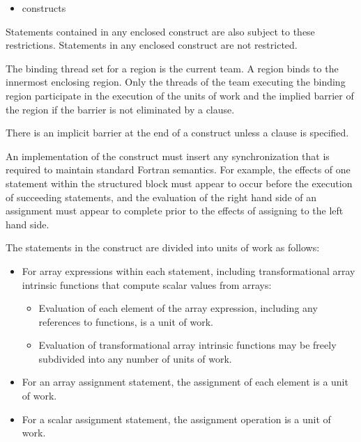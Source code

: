 \begin{fortranspecific}
\begin{itemize}
\item {} constructs
\end{itemize}

Statements contained in any enclosed  construct are also subject to these
restrictions. Statements in any enclosed  construct are not restricted.

\binding
The binding thread set for a  region is the current team. A 
region binds to the innermost enclosing  region. Only the threads of the team
executing the binding  region participate in the execution of the units of
work and the implied barrier of the  region if the barrier is not eliminated
by a  clause.

\descr
There is an implicit barrier at the end of a  construct unless a 
clause is specified.

An implementation of the  construct must insert any synchronization that is
required to maintain standard Fortran semantics. For example, the effects of one
statement within the structured block must appear to occur before the execution of
succeeding statements, and the evaluation of the right hand side of an assignment must
appear to complete prior to the effects of assigning to the left hand side.

The statements in the  construct are divided into units of work as follows:

\begin{itemize}
\item For array expressions within each statement, including transformational array
intrinsic functions that compute scalar values from arrays:

\begin{itemize} %
\item Evaluation of each element of the array expression, including any references to
 functions, is a unit of work.

\item Evaluation of transformational array intrinsic functions may be freely subdivided
into any number of units of work.
\end{itemize}

\item For an array assignment statement, the assignment of each element is a unit of work.

\item For a scalar assignment statement, the assignment operation is a unit of work.


\end{itemize}
\end{fortranspecific}
